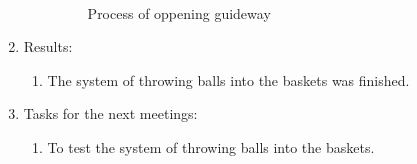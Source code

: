 \begin{enumerate}
\begin{enumerate}
\begin{figure}[H]
\begin{minipage}[h]{0.24\linewidth}
			\end{minipage}
			\caption{Process of oppening guideway}
		\end{figure}

	\end{enumerate}
	
	\item Results:
	\begin{enumerate}
		
		\item The system of throwing balls into the baskets was finished.
		
	\end{enumerate}
	
	\item Tasks for the next meetings:
	\begin{enumerate}
		
		\item To test the system of throwing balls into the baskets.
			
	\end{enumerate}
\end{enumerate}
\fillpage
